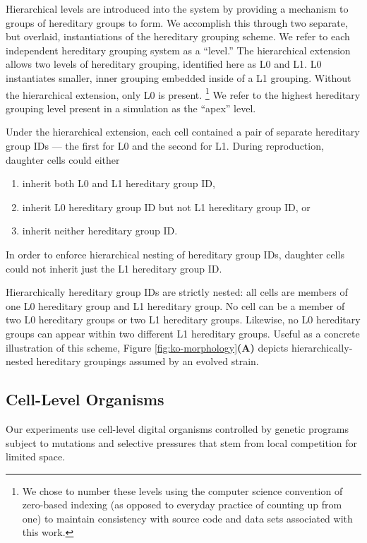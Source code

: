 Hierarchical levels are introduced into the system by providing a mechanism to groups of hereditary groups to form.
We accomplish this through two separate, but overlaid, instantiations of the hereditary grouping scheme.
We refer to each independent hereditary grouping system as a ``level.''
The hierarchical extension allows two levels of hereditary grouping, identified here as L0 and L1.
L0 instantiates smaller, inner grouping embedded inside of a L1 grouping.
Without the hierarchical extension, only L0 is present.
\footnote{
We chose to number these levels using the computer science convention of zero-based indexing (as opposed to everyday practice of counting up from one) to maintain consistency with source code and data sets associated with this work.
}
We refer to the highest hereditary grouping level present in a simulation as the ``apex'' level.

Under the hierarchical extension, each cell contained a pair of separate hereditary group IDs --- the first for L0 and the second for L1.
During reproduction, daughter cells could either
\begin{enumerate}
\item inherit both L0 and L1 hereditary group ID,
\item inherit L0 hereditary group ID but not L1 hereditary group ID, or
\item inherit neither hereditary group ID.
\end{enumerate}
In order to enforce hierarchical nesting of hereditary group IDs, daughter cells could not inherit just the L1 hereditary group ID.

Hierarchically hereditary group IDs are strictly nested: all cells are members of one L0 hereditary group and L1 hereditary group.
No cell can be a member of two L0 hereditary groups or two L1 hereditary groups.
Likewise, no L0 hereditary groups can appear within two different L1 hereditary groups.
Useful as a concrete illustration of this scheme, Figure \ref{fig:ko-morphology}\textbf{(A)} depicts hierarchically-nested hereditary groupings assumed by an evolved strain.

\subsection{Cell-Level Organisms}

Our experiments use cell-level digital organisms controlled by genetic programs subject to mutations and selective pressures that stem from local competition for limited space.

